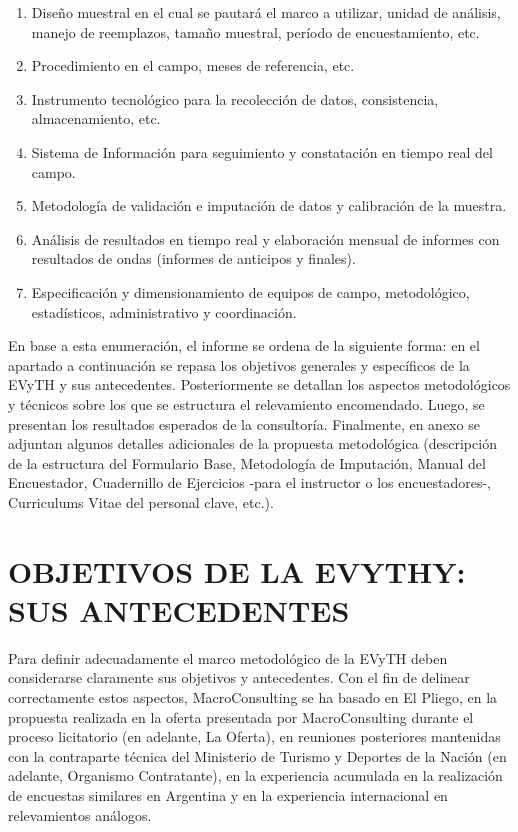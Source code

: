 \documentclass[
  openany]{book}
\providecommand{\tightlist}{%
  \setlength{\itemsep}{0pt}\setlength{\parskip}{0pt}}
\begin{document}
\begin{enumerate}
\def\labelenumi{\arabic{enumi})}
\tightlist
\item
  Diseño muestral en el cual se pautará el marco a utilizar, unidad de
  análisis, manejo de reemplazos, tamaño muestral, período de
  encuestamiento, etc.
\item
  Procedimiento en el campo, meses de referencia, etc.
\item
  Instrumento tecnológico para la recolección de datos, consistencia,
  almacenamiento, etc.
\item
  Sistema de Información para seguimiento y constatación en tiempo
  real del campo.
\item
  Metodología de validación e imputación de datos y calibración de la
  muestra.
\item
  Análisis de resultados en tiempo real y elaboración mensual de
  informes con resultados de ondas (informes de anticipos y finales).
\item
  Especificación y dimensionamiento de equipos de campo, metodológico,
  estadísticos, administrativo y coordinación.
\end{enumerate}

En base a esta enumeración, el informe se ordena de la siguiente forma:
en el apartado a continuación se repasa los objetivos generales y
específicos de la EVyTH y sus antecedentes. Posteriormente se detallan
los aspectos metodológicos y técnicos sobre los que se estructura el
relevamiento encomendado. Luego, se presentan los resultados esperados
de la consultoría. Finalmente, en anexo se adjuntan algunos detalles
adicionales de la propuesta metodológica (descripción de la estructura
del Formulario Base, Metodología de Imputación, Manual del Encuestador,
Cuadernillo de Ejercicios -para el instructor o los encuestadores-,
Curriculums Vitae del personal clave, etc.).

\hypertarget{objetivos-de-la-evythy-sus-antecedentes}{%
\section{\texorpdfstring{\textbf{OBJETIVOS DE LA EVYTHY: SUS ANTECEDENTES}}{OBJETIVOS DE LA EVYTHY: SUS ANTECEDENTES}}\label{objetivos-de-la-evythy-sus-antecedentes}}

Para definir adecuadamente el marco metodológico de la EVyTH deben
considerarse claramente sus objetivos y antecedentes. Con el fin de
delinear correctamente estos aspectos, MacroConsulting se ha basado en
El Pliego, en la propuesta realizada en la oferta presentada por
MacroConsulting durante el proceso licitatorio (en adelante, La Oferta),
en reuniones posteriores mantenidas con la contraparte técnica del
Ministerio de Turismo y Deportes de la Nación (en adelante, Organismo
Contratante), en la experiencia acumulada en la realización de encuestas
similares en Argentina y en la experiencia internacional en
relevamientos análogos.
\end{document}
